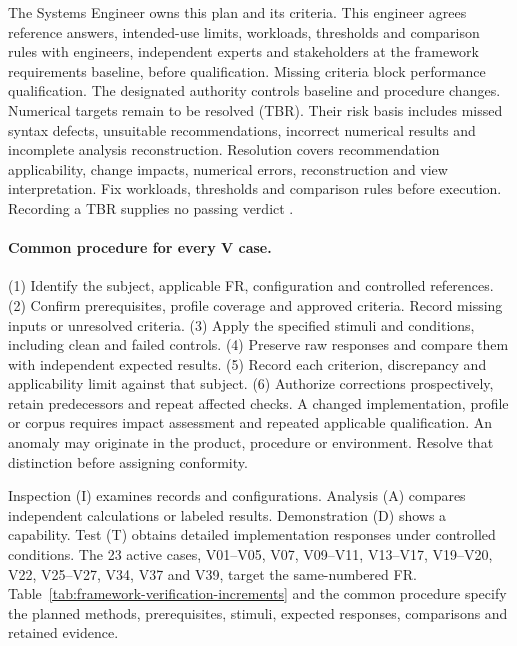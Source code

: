 The Systems Engineer owns this plan and its criteria. This engineer agrees reference answers, intended-use limits, workloads, thresholds and comparison rules with engineers, independent experts and stakeholders at the framework requirements baseline, before qualification. Missing criteria block performance qualification. The designated authority controls baseline and procedure changes. Numerical targets remain to be resolved (TBR). Their risk basis includes missed syntax defects, unsuitable recommendations, incorrect numerical results and incomplete analysis reconstruction. Resolution covers recommendation applicability, change impacts, numerical errors, reconstruction and view interpretation. Fix workloads, thresholds and comparison rules before execution. Recording a TBR supplies no passing verdict \citep[Secs.~6.1.1.2.4 and~6.7]{nasa2016systems}.

\paragraph{Common procedure for every V case.}
(1) Identify the subject, applicable FR, configuration and controlled references. (2) Confirm prerequisites, profile coverage and approved criteria. Record missing inputs or unresolved criteria. (3) Apply the specified stimuli and conditions, including clean and failed controls. (4) Preserve raw responses and compare them with independent expected results. (5) Record each criterion, discrepancy and applicability limit against that subject. (6) Authorize corrections prospectively, retain predecessors and repeat affected checks. A changed implementation, profile or corpus requires impact assessment and repeated applicable qualification. An anomaly may originate in the product, procedure or environment. Resolve that distinction before assigning conformity.

Inspection (I) examines records and configurations. Analysis (A) compares independent calculations or labeled results. Demonstration (D) shows a capability. Test (T) obtains detailed implementation responses under controlled conditions. The 23 active cases, V01--V05, V07, V09--V11, V13--V17, V19--V20, V22, V25--V27, V34, V37 and V39, target the same-numbered FR. Table~\ref{tab:framework-verification-increments} and the common procedure specify the planned methods, prerequisites, stimuli, expected responses, comparisons and retained evidence.

